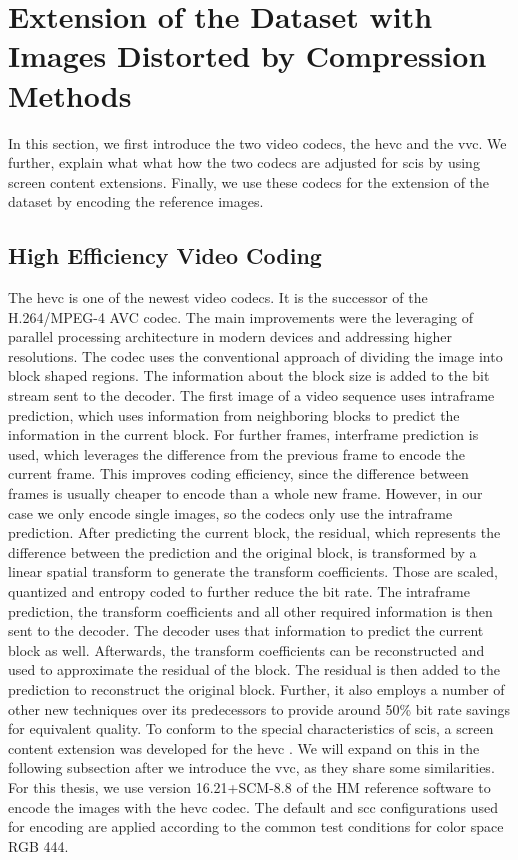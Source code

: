 \section{Extension of the Dataset with Images Distorted by Compression Methods}
\label{sec:dataset_codec}

In this section, we first introduce the two video codecs, the \gls{hevc} and the \gls{vvc}.
We further, explain what what how the two codecs are adjusted for \glspl{sci} by using screen content extensions.
Finally, we use these codecs for the extension of the dataset by encoding the reference images.

\subsection{High Efficiency Video Coding}
\label{subsec:hevc}

The \gls{hevc} \cite{hevc_2012} is one of the newest video codecs.
It is the successor of the H.264/MPEG-4 AVC codec.
The main improvements were the leveraging of parallel processing architecture in modern devices and addressing higher resolutions.
The codec uses the conventional approach of dividing the image into block shaped regions.
The information about the block size is added to the bit stream sent to the decoder.
The first image of a video sequence uses intraframe prediction, which uses information from neighboring blocks to predict the information in the current block.
For further frames, interframe prediction is used, which leverages the difference from the previous frame to encode the current frame.
This improves coding efficiency, since the difference between frames is usually cheaper to encode than a whole new frame.
However, in our case we only encode single images, so the codecs only use the intraframe prediction.
After predicting the current block, the residual, which represents the difference between the prediction and the original block, is transformed by a linear spatial transform to generate the transform coefficients.
Those are scaled, quantized and entropy coded to further reduce the bit rate.
The intraframe prediction, the transform coefficients and all other required information is then sent to the decoder.
The decoder uses that information to predict the current block as well.
Afterwards, the transform coefficients can be reconstructed and used to approximate the residual of the block.
The residual is then added to the prediction to reconstruct the original block.
Further, it also employs a number of other new techniques over its predecessors to provide around 50\% bit rate savings for equivalent quality.
To conform to the special characteristics of \glspl{sci}, a screen content extension was developed for the \gls{hevc} \cite{hevc_scc_2015}.
We will expand on this in the following subsection after we introduce the \gls{vvc}, as they share some similarities.
For this thesis, we use version 16.21+SCM-8.8 of the HM reference software \cite{hevc_software_2020} to encode the images with the \gls{hevc} codec.
The default \cite{config_hevc_2013} and \gls{scc} \cite{config_hevc_scc_2015} configurations used for encoding are applied according to the common test conditions for color space RGB 444.

